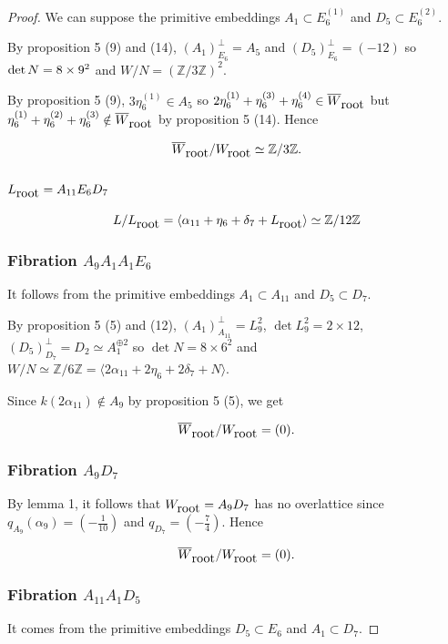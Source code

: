 \documentclass{amsart}
\begin{document}
\begin{proof}
We can suppose the primitive embeddings $A_1 \subset E_6^{(1)}$ and $D_5 \subset E_6^{(2)}$.

By proposition 5 (9) and (14), $(A_1)_{E_6}^{\perp}=A_5$ and $(D_5)_{E_6}^{\perp}=(-12)$ so $\hbox{det}\,N=8\times 9^2$ and $W/N=(\mathbb Z/3 \mathbb Z)^2$.

By proposition 5 (9), $3\eta_6^{(1)} \in A_5$  so $2\eta_6^{(1)}+\eta_6^{(3)}+\eta_6^{(4)} \in \overline{W}_{\hbox{root}}$ but $\eta_6^{(1)}+\eta_6^{(2)}+\eta_6^{(3)} \notin \overline{W}_{\hbox{root}}$ by proposition 5 (14). Hence

$$\overline{W}_{\hbox{root}}/W_{\hbox{root}}\simeq \mathbb Z /3\mathbb Z.$$




\subsection{$L_{\hbox{root}}=A_{11} E_6 D_7$}
$$L/L_{\hbox{root}}= \langle \alpha_{11}+\eta_6+\delta_7+L_{\hbox{root}} \rangle \simeq \mathbb Z /12 \mathbb Z$$

\subsubsection{ Fibration $A_9 A_1 A_1 E_6$}
It follows from the primitive embeddings $A_1 \subset A_{11}$ and $D_5 \subset D_7$.

By proposition 5 (5) and (12), $(A_1)_{A_{11}}^{\perp}=L_9^2$, $\det L_9^2=2\times 12$, $(D_5)_{D_7}^{\perp}=D_2 \simeq A_1^{\oplus 2}$ so $\det N=8\times 6^2$ and $W/N \simeq \mathbb Z/6 \mathbb Z =\langle 2\alpha_{11}+2\eta_6+2\delta_7+N \rangle $.

Since $k(2\alpha_{11}) \notin A_9$ by proposition 5 (5), we get

$$\overline{W}_{\hbox{root}}/W_{\hbox{root}}= (0).$$



\subsubsection{Fibration $A_9 D_7$}

By lemma 1, it follows that $W_{\hbox{root}}=A_9 D_7$ has no overlattice since $q_{A_9}(\alpha _{9})=\left (-\frac {1}{10}\right )$ and $q_{D_7}=\left (-\frac {7}{4}\right )$. Hence


$$\overline{W}_{\hbox{root}}/W_{\hbox{root}}= (0).$$

\subsubsection{Fibration $A_{11} A_1 D_5$}
It comes from the primitive embeddings $D_5 \subset E_6$ and $A_1 \subset D_7$.


\end{proof}
\end{document}
